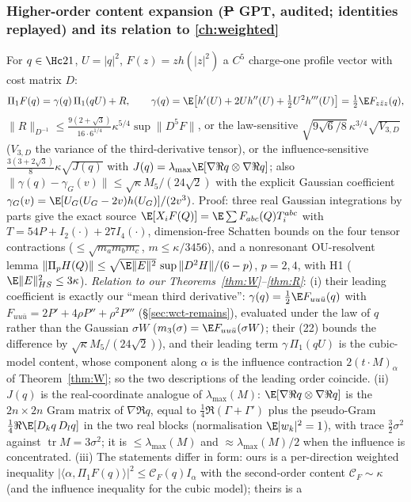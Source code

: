 \subsubsection{Higher-order content expansion (\st{P} GPT, audited; identities replayed) and its relation to \autoref{ch:weighted}}\label{sec:knext-content}
For $q\in\Hc21$, $U=|q|^2$, $F(z)=zh(|z|^2)$ a $C^5$ charge-one profile vector with cost matrix $D$:
\[
\Pi_1F(q)=\gamma(q)\,\Pi_1(qU)+R,\qquad \gamma(q)=\E\bigl[h'(U)+2Uh''(U)+\tfrac12U^2h'''(U)\bigr]=\tfrac12\E F_{z\bar z z}(q),
\]
$\|R\|_{D^{-1}}\le\frac{9(2+\sqrt3)}{16\cdot6^{1/4}}\kappa^{5/4}\sup\|D^5F\|$, or the law-sensitive $\sqrt{9\sqrt6/8}\,\kappa^{3/4}\sqrt{V_{3,D}}$ ($V_{3,D}$ the variance of the third-derivative tensor), or the
influence-sensitive $\frac{3(3+2\sqrt3)}8\kappa\sqrt{J(q)}$ with $J(q)=\lambda_{\max}\E[\nabla\Re q\otimes\nabla\Re q]$; also $\|\gamma(q)-\gamma_G(v)\|\le\sqrt\kappa M_5/(24\sqrt2)$ with the explicit Gaussian
coefficient $\gamma_G(v)=\E[U_G(U_G-2v)h(U_G)]/(2v^3)$. Proof: three real Gaussian integrations by parts give the exact source $\E[X_iF(Q)]=\E\sum F_{abc}(Q)T_i^{abc}$ with $T=54P+I_2(\cdot)+27I_4(\cdot)$,
dimension-free Schatten bounds on the four tensor contractions ($\le\sqrt{m_am_bm_c}$, $m\le\kappa/3456$), and a nonresonant OU-resolvent lemma $\|\Pi_pH(Q)\|\le\sqrt{\E\|E\|^2}\,\sup\|D^2H\|/(6-p)$,
$p=2,4$, with H1 ($\E\|E\|_{HS}^2\le3\kappa$). \emph{Relation to our Theorems~\ref{thm:W}--\ref{thm:R}}: (i) their leading coefficient is exactly our ``mean third derivative'': $\gamma(q)=\frac12\E F_{uu\bar u}(q)$
with $F_{uu\bar u}=2P'+4\rho P''+\rho^2P'''$ (\S\ref{sec:wct-remains}), evaluated under the law of $q$ rather than the Gaussian $\sigma W$ ($m_3(\sigma)=\E F_{uu\bar u}(\sigma W)$; their (22) bounds the
difference by $\sqrt\kappa M_5/(24\sqrt2)$), and their leading term $\gamma\,\Pi_1(qU)$ is the cubic-model content, whose component along $\alpha$ is the influence contraction $2(t\cdot M)_\alpha$ of
Theorem~\ref{thm:W}; so the two descriptions of the leading order coincide. (ii) $J(q)$ is the real-coordinate analogue of $\lambda_{\max}(M)$: $\E[\nabla\Re q\otimes\nabla\Re q]$ is the $2n\times2n$
Gram matrix of $\nabla\Re q$, equal to $\frac14\Re(\Gamma+\Gamma')$ plus the pseudo-Gram $\frac14\Re\E[D_kq\,D_lq]$ in the two real blocks (normalisation $\E|w_k|^2=1$), with trace $\frac32\sigma^2$
against $\operatorname{tr}M=3\sigma^2$; it is $\le\lambda_{\max}(M)$ and $\approx\lambda_{\max}(M)/2$ when the influence is concentrated. (iii) The statements differ in form: ours is a per-direction
weighted inequality $|\langle\alpha,\Pi_1F(q)\rangle|^2\le\mathcal C_F(q)I_\alpha$ with the second-order content $\mathcal C_F\sim\kappa$ (and the influence inequality for the cubic model); theirs is a
